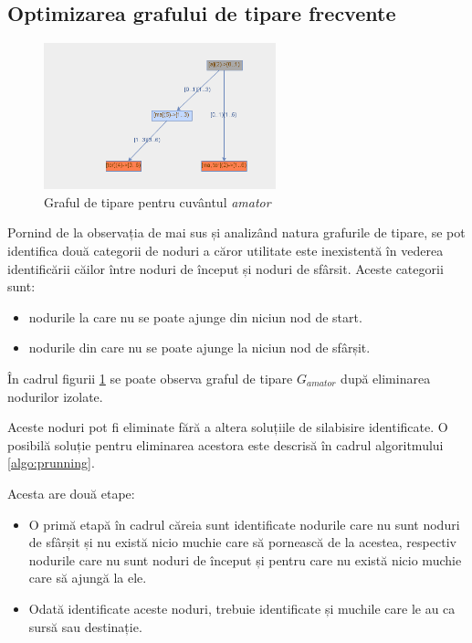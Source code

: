 \subsection{Optimizarea grafului de tipare frecvente}

\begin{figure}[h]
    \centering
    \includegraphics[width=0.6\textwidth]{figures/rosil-amator-prunned.png}
    \caption{Graful de tipare pentru cuvântul \textit{amator}}
    \label{fig:rosil-amator-prunned}
\end{figure}

Pornind de la observația de mai sus și analizând natura grafurile de tipare, se pot identifica două categorii de noduri a căror utilitate este inexistentă în vederea identificării căilor între noduri de început și noduri de sfârsit. Aceste categorii sunt:
\begin{itemize}
\item nodurile la care nu se poate ajunge din niciun nod de start.
\item nodurile din care nu se poate ajunge la niciun nod de sfârșit. 
\end{itemize}

\begin{ex}
În cadrul figurii \ref{fig:rosil-amator-prunned} se poate observa graful de tipare $G_{amator}$ după eliminarea nodurilor izolate.
\end{ex}

Aceste noduri pot fi eliminate fără a altera soluțiile de silabisire identificate. O posibilă soluție pentru eliminarea acestora este descrisă în cadrul algoritmului \ref{algo:prunning}. 

Acesta are două etape: 
\begin{itemize}
\item O primă etapă în cadrul căreia sunt identificate nodurile care nu sunt noduri de sfârșit și nu există nicio muchie care să pornească de la acestea, respectiv nodurile care nu sunt noduri de început și pentru care nu există nicio muchie care să ajungă la ele.
\item Odată identificate aceste noduri, trebuie identificate și muchile care le au ca sursă sau destinație.
\end{itemize}

